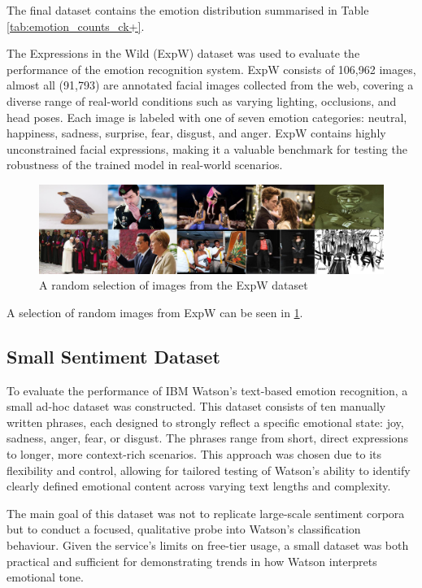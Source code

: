 The final dataset contains the emotion distribution summarised in Table \ref{tab:emotion_counts_ck+}.


The Expressions in the Wild (ExpW) dataset was used to evaluate the performance of the emotion recognition system. ExpW consists of 106,962 images, almost all (91,793) are annotated facial images collected from the web, covering a diverse range of real-world conditions such as varying lighting, occlusions, and head poses. Each image is labeled with one of seven emotion categories: neutral, happiness, sadness, surprise, fear, disgust, and anger. ExpW contains highly unconstrained facial expressions, making it a valuable benchmark for testing the robustness of the trained model in real-world scenarios.

\begin{figure}[!htb]
    \centering{}
    \includegraphics[scale=0.18]{m+m_images/exp_w_sample.jpg}
    \caption{A random selection of images from the ExpW dataset}
    \label{figure:exp_w_sample}
\end{figure}

A selection of random images from ExpW can be seen in \ref{figure:exp_w_sample}.

\subsection{Small Sentiment Dataset}

To evaluate the performance of IBM Watson's text-based emotion recognition, a small ad-hoc dataset was constructed. This dataset consists of ten manually written phrases, each designed to strongly reflect a specific emotional state: joy, sadness, anger, fear, or disgust. The phrases range from short, direct expressions to longer, more context-rich scenarios. This approach was chosen due to its flexibility and control, allowing for tailored testing of Watson's ability to identify clearly defined emotional content across varying text lengths and complexity.

The main goal of this dataset was not to replicate large-scale sentiment corpora but to conduct a focused, qualitative probe into Watson's classification behaviour. Given the service's limits on free-tier usage, a small dataset was both practical and sufficient for demonstrating trends in how Watson interprets emotional tone.


